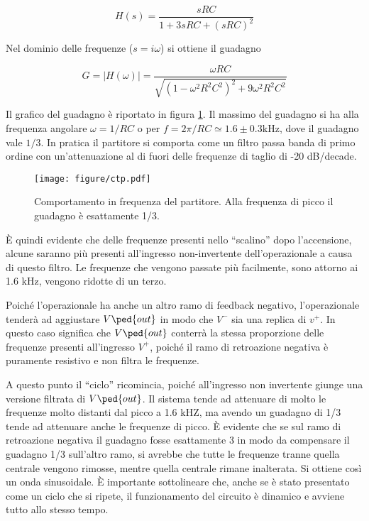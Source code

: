 \begin{equation}
    H(s) = \frac{sRC}{1 + 3sRC + (sRC)^2}
\end{equation}

Nel dominio delle frequenze ($s = i\omega$) si ottiene il guadagno

\begin{equation}
    G = |H(\omega)| = \frac{\omega RC}{\sqrt{(1 - \omega^2R^2C^2)^2 + 9\omega^2R^2C^2}}
\end{equation}

Il grafico del guadagno è riportato in figura \ref{fig:partitore8}. Il massimo del guadagno si ha alla frequenza
angolare $\omega = 1/RC$ o per $f = 2\pi/RC \simeq 1.6 \pm 0.3 \si{\kilo\hertz}$, dove il guadagno vale $1/3$. In pratica il partitore
si comporta come un filtro passa banda di primo ordine con un'attenuazione al di fuori delle frequenze di taglio
di -20 dB/decade.

\begin{figure}
    \centering
    \texttt{[image: figure/ctp.pdf]}
    \caption{Comportamento in frequenza del partitore. Alla frequenza di picco il guadagno è esattamente 1/3.}
    \label{fig:partitore8}
\end{figure}

È quindi evidente che delle frequenze presenti nello ``scalino'' dopo l'accensione, alcune saranno più presenti
all'ingresso non-invertente dell'operazionale a causa di questo filtro. Le frequenze che vengono passate più facilmente,
sono attorno ai 1.6 kHz, vengono ridotte di un terzo.

Poiché l'operazionale ha anche un altro ramo di feedback negativo, l'operazionale tenderà ad aggiustare $V\ped{out}$
in modo che $V^-$ sia una replica di $v^+$. In questo caso significa che $V\ped{out}$ conterrà la stessa proporzione
delle frequenze presenti all'ingresso $V^+$, poiché il ramo di retroazione negativa è puramente resistivo e non filtra
le frequenze.

A questo punto il ``ciclo'' ricomincia, poiché all'ingresso non invertente giunge una versione filtrata di $V\ped{out}$.
Il sistema tende ad attenuare di molto le frequenze molto distanti dal picco a 1.6 kHZ, ma avendo un guadagno di 1/3 tende
ad attenuare anche le frequenze di picco. È evidente che se sul ramo di retroazione negativa il guadagno fosse esattamente 3
in modo da compensare il guadagno 1/3 sull'altro ramo,
si avrebbe che tutte le frequenze tranne quella centrale vengono rimosse, mentre quella centrale rimane inalterata.
Si ottiene così un onda sinusoidale. È importante sottolineare che, anche se è stato presentato come un ciclo che si ripete,
il funzionamento del circuito è dinamico e avviene tutto allo stesso tempo.

